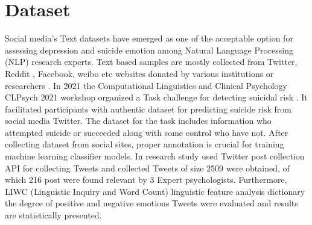 \documentclass[sn-mathphys,Numbered]{sn-jnl}%
\theoremstyle{thmstyleone}%
\theoremstyle{thmstyletwo}%
\theoremstyle{thmstylethree}%
\begin{document}
\section{Dataset}
\label{dtset}
Social media's Text datasets have emerged as one of the acceptable option for assessing depression and suicide emotion among Natural Language Processing (NLP) research experts. Text based samples are mostly collected from Twitter, Reddit \cite{tadesse2019detection}, Facebook, weibo etc websites donated by various institutions or researchers \cite{rissola2020dataset}. In 2021 the Computational Linguistics and Clinical Psychology CLPsych 2021 workshop organized a Task challenge for detecting suicidal risk \cite{macavaney2021community}. It facilitated participants with authentic dataset for predicting suicide risk from social media Twitter. The dataset for the task includes information who attempted suicide or succeeded along with some control who have not. After collecting dataset from social sites, proper annotation is crucial for training machine learning classifier models. In\cite{lopez2022exploring} research study used Twitter post collection API for collecting Tweets and collected Tweets of size 2509 were obtained, of which 216 post were found relevant by 3 Expert psychologists. Furthermore, LIWC (Linguistic Inquiry and Word Count) \cite{pennebaker2001linguistic} linguistic feature analysis dictionary the degree of positive and negative emotions Tweets were evaluated and results are statistically presented. 
\end{document}
